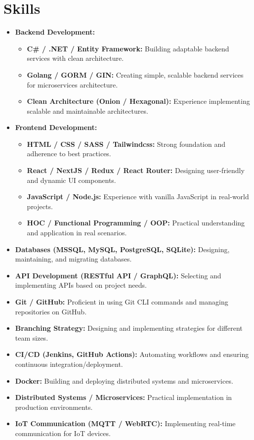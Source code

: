 \section{Skills}

\begin{itemize}[leftmargin=3em, label={$\bullet$}]
    \item \textbf{Backend Development:}  
        \begin{itemize}
            \item \textbf{C\# / .NET / Entity Framework:} Building adaptable backend services with clean architecture.
            \item \textbf{Golang / GORM / GIN:} Creating simple, scalable backend services for microservices architecture.
            \item \textbf{Clean Architecture (Onion / Hexagonal):} Experience implementing scalable and maintainable architectures.
        \end{itemize}
    \item \textbf{Frontend Development:}  
        \begin{itemize}
            \item \textbf{HTML / CSS / SASS / Tailwindcss:} Strong foundation and adherence to best practices.
            \item \textbf{React / NextJS / Redux / React Router:} Designing user-friendly and dynamic UI components.
            \item \textbf{JavaScript / Node.js:} Experience with vanilla JavaScript in real-world projects.
            \item \textbf{HOC / Functional Programming / OOP:} Practical understanding and application in real scenarios.
        \end{itemize}
    \item \textbf{Databases (MSSQL, MySQL, PostgreSQL, SQLite):} Designing, maintaining, and migrating databases.
    \item \textbf{API Development (RESTful API / GraphQL):} Selecting and implementing APIs based on project needs.
    \item \textbf{Git / GitHub:} Proficient in using Git CLI commands and managing repositories on GitHub.
    \item \textbf{Branching Strategy:} Designing and implementing strategies for different team sizes.
    \item \textbf{CI/CD (Jenkins, GitHub Actions):} Automating workflows and ensuring continuous integration/deployment.
    \item \textbf{Docker:} Building and deploying distributed systems and microservices.
    \item \textbf{Distributed Systems / Microservices:} Practical implementation in production environments.
    \item \textbf{IoT Communication (MQTT / WebRTC):} Implementing real-time communication for IoT devices.
\end{itemize}
